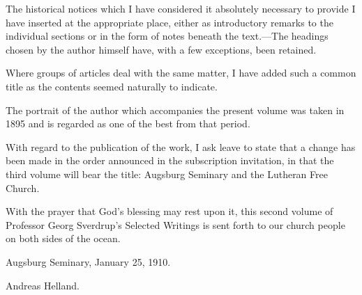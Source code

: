 The historical notices which I have considered it absolutely necessary to provide I have inserted at the appropriate place, either as introductory remarks to the individual sections or in the form of notes beneath the text.—The headings chosen by the author himself have, with a few exceptions, been retained.


Where groups of articles deal with the same matter, I have added such a common title as the contents seemed naturally to indicate.

The portrait of the author which accompanies the present volume was taken in 1895 and is regarded as one of the best from that period.

With regard to the publication of the work, I ask leave to state that a change has been made in the order announced in the subscription invitation, in that the third volume will bear the title: Augsburg Seminary and the Lutheran Free Church.

With the prayer that God’s blessing may rest upon it, this second volume of Professor Georg Sverdrup’s Selected Writings is sent forth to our church people on both sides of the ocean.

Augsburg Seminary, January 25, 1910.

Andreas Helland.